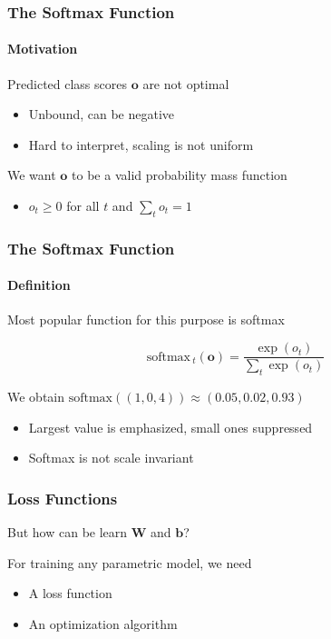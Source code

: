 \documentclass[xetex,professionalfont]{beamer}
\renewcommand\emph[1]{\textcolor{tuwcvl_cvl_blue}{#1}}
\renewcommand{\vec}[1]{\ensuremath{\mathbf{#1}}}
\newcommand{\vb}{\vec{b}}
\newcommand{\vo}{\vec{o}}
\newcommand{\vW}{\vec{W}}
\begin{document}
\begin{frame}
  \frametitle{The Softmax Function}
\framesubtitle{Motivation}

Predicted class scores $\vo$ are not optimal
\begin{itemize}
    \item Unbound, can be negative
    \item Hard to interpret, scaling is not uniform
\end{itemize}

\bigskip

We want $\vo$ to be a valid probability mass function
\begin{itemize}
    \item $o_t\geq0$ for all $t$ and $\sum_t o_t=1$
\end{itemize}

\end{frame}


\begin{frame}
  \frametitle{The Softmax Function}
\framesubtitle{Definition}

Most popular function for this purpose is \emph{softmax} %

\smallskip

\[
    \text{softmax}\,_t(\vo)=\frac{\exp(o_t)}{\sum_t \exp(o_t)}  %
\]

\bigskip

We obtain $\text{softmax}((1,0,4))\approx(0.05, 0.02, 0.93)$
\begin{itemize}
    \item Largest value is emphasized, small ones suppressed
    \item Softmax is not scale invariant %
\end{itemize}

\end{frame}


\begin{frame}
\frametitle{Loss Functions}

But how can be learn $\vW$ and $\vb$?

\bigskip

For training any parametric model, we need %
\begin{itemize}
    \item A loss function %
    \item An optimization algorithm %
\end{itemize}

\end{frame}
\end{document}
